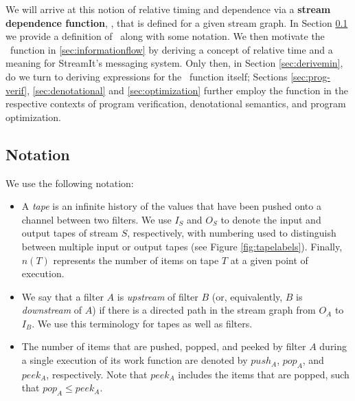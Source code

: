 We will arrive at this notion of relative timing and dependence via a
{\bf stream dependence function}, \sdep, that is defined for a given
stream graph. In Section \ref{sec:notation} we provide a definition of
\sdep~along with some notation.  We then motivate the \sdep~function
in \ref{sec:informationflow} by deriving a concept of relative time
and a meaning for StreamIt's messaging system.  Only then, in Section
\ref{sec:derivemin}, do we turn to deriving expressions for the
\sdep~function itself; Sections \ref{sec:prog-verif},
\ref{sec:denotational} and \ref{sec:optimization} further employ the
function in the respective contexts of program verification,
denotational semantics, and program optimization.

\subsection{Notation}
\label{sec:notation}

We use the following notation:

\begin{itemize}

\item A {\it tape} is an infinite history of the values that have been
  pushed onto a channel between two filters. We use $I_S$ and $O_S$ to
  denote the input and output tapes of stream $S$, respectively, with
  numbering used to distinguish between multiple input or output tapes
  (see Figure \ref{fig:tapelabels}).  Finally, $n(T)$ represents the
  number of items on tape $T$ at a given point of execution.

\item We say that a filter $A$ is {\it upstream} of filter $B$ (or,
  equivalently, $B$ is {\it downstream} of $A$) if there is a directed
  path in the stream graph from $O_A$ to $I_B$.  We use this
  terminology for tapes as well as filters.

\item The number of items that are pushed, popped, and peeked by
  filter $A$ during a single execution of its work function are
  denoted by $push_A$, $pop_A$, and $peek_A$, respectively.  Note that
  $peek_A$ includes the items that are popped, such that $pop_A \le
  peek_A$.

\end{itemize}

